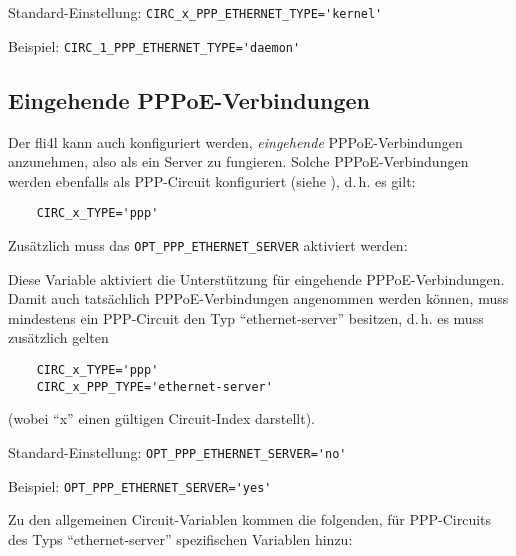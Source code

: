 \begin{description}
Standard-Einstellung: \verb+CIRC_x_PPP_ETHERNET_TYPE='kernel'+

Beispiel: \verb+CIRC_1_PPP_ETHERNET_TYPE='daemon'+

\end{description}

\subsection{Eingehende PPPoE-Verbindungen}

Der fli4l kann auch konfiguriert werden, \emph{eingehende} PPPoE-Verbindungen
anzunehmen, also als ein Server zu fungieren. Solche PPPoE-Verbindungen werden
ebenfalls als PPP-Circuit konfiguriert (siehe
), d.\,h. es gilt:

\begin{example}
\begin{verbatim}
    CIRC_x_TYPE='ppp'
\end{verbatim}
\end{example}

Zusätzlich muss das \verb+OPT_PPP_ETHERNET_SERVER+ aktiviert werden:

\begin{description}

Diese Variable aktiviert die Unterstützung für eingehende PPPoE-Verbindungen.
Damit auch tatsächlich PPPoE-Verbindungen angenommen werden können, muss
mindestens ein PPP-Circuit den Typ ``ethernet-server'' besitzen, d.\,h. es muss
zusätzlich gelten

\begin{example}
\begin{verbatim}
    CIRC_x_TYPE='ppp'
    CIRC_x_PPP_TYPE='ethernet-server'
\end{verbatim}
\end{example}

(wobei ``x'' einen gültigen Circuit-Index darstellt).

Standard-Einstellung: \verb+OPT_PPP_ETHERNET_SERVER='no'+

Beispiel: \verb+OPT_PPP_ETHERNET_SERVER='yes'+
\end{description}

Zu den allgemeinen Circuit-Variablen kommen die folgenden, für PPP-Circuits
des Typs ``ethernet-server'' spezifischen Variablen hinzu:

